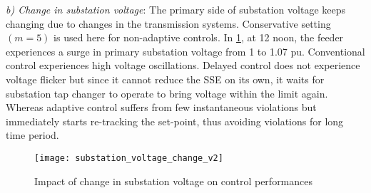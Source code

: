 \documentclass[journal]{IEEEtran}
\begin{document}
\textit{b) Change in substation voltage}: The primary side of substation voltage keeps changing due to changes in the transmission systems. Conservative setting $(m=5)$ is used here for non-adaptive controls. In  \figurename \ref{fig:substation_change}, at 12 noon, the feeder experiences a surge in primary substation voltage from 1 to 1.07 pu. Conventional control experiences high voltage oscillations. Delayed control does not experience voltage flicker but since it cannot reduce the SSE on its own, it waits for substation tap changer to operate to bring voltage within the limit again. Whereas adaptive control suffers from few instantaneous violations but immediately starts re-tracking the set-point, thus avoiding violations for long time period.
\begin{figure}
	\centering
	\texttt{[image: substation\_voltage\_change\_v2]}
    \vspace{-1.5em}
    \caption {Impact of change in substation voltage on control performances}
    \label{fig:substation_change}
    \vspace{-.5em}
\end{figure}

\end{document}

